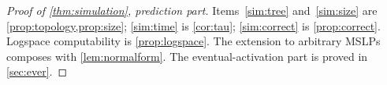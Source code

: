 \begin{proof}[Proof of \cref{thm:simulation}, prediction part]
Items~\ref{sim:tree} and~\ref{sim:size} are \cref{prop:topology,prop:size}; \ref{sim:time} is
\cref{cor:tau}; \ref{sim:correct} is \cref{prop:correct}. Logspace computability is
\cref{prop:logspace}. The extension to arbitrary MSLPs composes with \cref{lem:normalform}. The
eventual-activation part is proved in \cref{sec:ever}.
\end{proof}

